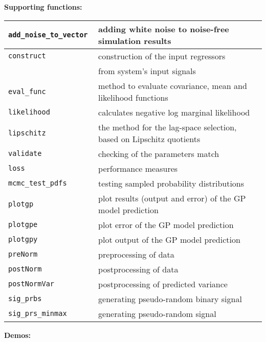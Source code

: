 \documentclass[12pt,twoside]{article}
\newcommand{\fun}[1]{\tt #1}
\begin{document}
{\textbf{Supporting functions:}\\
\begin{tabular}{|l|l|}
 \hline \fun{add\_noise\_to\_vector} & adding white noise to noise-free simulation results\\
 \hline \fun{construct} & construction of the input regressors\\
  & from system's input signals\\
 \hline \fun{eval\_func} & method to evaluate covariance, mean and likelihood functions\\
 \hline \fun{likelihood} & calculates negative log marginal likelihood\\
 \hline \fun{lipschitz} & the method for the lag-space selection, based on Lipschitz quotients\\
 \hline \fun{validate} & checking of the parameters match \\
 \hline \fun{loss} & performance measures \\
 \hline \fun{mcmc\_test\_pdfs} & testing sampled probability distributions\\
 \hline \fun{plotgp} & plot results (output and error) of the GP model prediction \\
 \hline \fun{plotgpe} & plot error of the GP model prediction \\
 \hline \fun{plotgpy} & plot output of the GP model prediction \\
 \hline \fun{preNorm} & preprocessing of data \\
 \hline \fun{postNorm} & postprocessing of data \\
 \hline \fun{postNormVar} & postprocessing of predicted variance\\
 \hline \fun{sig\_prbs} & generating pseudo-random binary signal \\
 \hline \fun{sig\_prs\_minmax} & generating pseudo-random signal \\ \hline
\end{tabular}



\pagebreak
\textbf{Demos:} \\
\begin{tabular}{|l|l|}


\end{tabular}}
\end{document}
